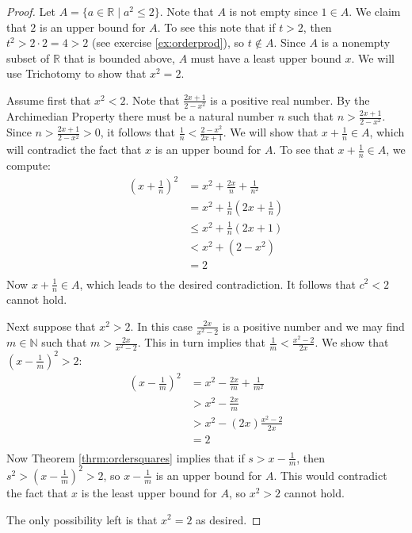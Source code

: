\begin{proof}
Let $A=\{ a\in\mathbb R \mid a^2\leq 2 \}$. Note that $A$ is not empty since $1\in A$. We claim that $2$ is an upper bound for $A$. To see this note that if $t>2$, then $t^2>2\cdot 2=4>2$ (see exercise \ref{ex:orderprod}), so $t\notin A$. Since $A$ is a nonempty subset of $\mathbb R$ that is bounded above, $A$ must have a least upper bound $x$. We will use Trichotomy to show that $x^2=2$.

Assume first that $x^2<2$. Note that $\frac{2x+1}{2-x^2}$ is a positive real number. By the Archimedian Property there must be a natural number $n$ such that $n> \frac{2x+1}{2-x^2}$. Since $n>\frac{2x+1}{2-x^2}>0$, it follows that $\frac 1n<\frac{2-x^2}{2x+1}$. We will show that $x+\frac 1n \in A$, which will contradict the fact that $x$ is an upper bound for $A$. To see that $x+\frac 1n\in A$, we compute:
\begin{equation*}
\begin{split}
\left(x+\frac 1n\right)^2&=x^2+\frac{2x}n+\frac1{n^2}\\
&=x^2+\frac 1n\left(2x +\frac 1n\right)\\
&\leq x^2+\frac 1n(2x+1)\\
&<x^2+(2-x^2)\\
&=2\\
\end{split}
\end{equation*}
Now $x+\frac 1n\in A$, which leads to the desired contradiction. It follows that $c^2<2$ cannot hold.

Next suppose that $x^2>2$. In this case $\frac{2x}{x^2-2}$ is a positive number and we may find $m\in\mathbb N$ such that $m >\frac{2x}{x^2-2}$. This in turn implies that $\frac 1m<\frac{x^2-2}{2x}$. We show that $(x-\frac1m)^2>2$:
\begin{equation*}
\begin{split}
\left(x-\frac1m\right)^2&=x^2-\frac{2x}m +\frac1{m^2}\\
&>x^2-\frac{2x}m\\
&>x^2-(2x)\frac{x^2-2}{2x}\\
&=2\\
\end{split}
\end{equation*}
Now Theorem \ref{thrm:ordersquares} implies that if $s>x-\frac1m$, then $s^2>(x-\frac1m)^2>2$, so $x-\frac1m$ is an upper bound for $A$. This would contradict the fact that $x$ is the least upper bound for $A$, so $x^2>2$ cannot hold.

The only possibility left is that $x^2=2$ as desired.
\end{proof}

